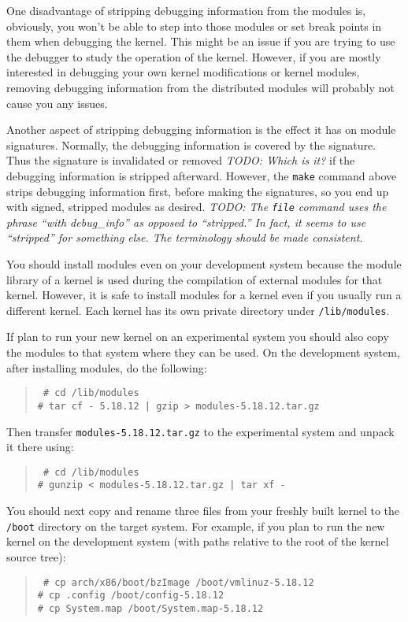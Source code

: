 \documentclass{article}
\newcommand{\command}[1]{\texttt{#1}}
\newcommand{\filename}[1]{\texttt{#1}}
\newcommand{\todo}[1]{\textit{TODO: #1}}
\newenvironment{commands}
  {\begin{quote} \tt}
  {\end{quote}}
\begin{document}
One disadvantage of stripping debugging information from the modules is, obviously, you won't be
able to step into those modules or set break points in them when debugging the kernel. This
might be an issue if you are trying to use the debugger to study the operation of the kernel.
However, if you are mostly interested in debugging your own kernel modifications or kernel
modules, removing debugging information from the distributed modules will probably not cause you
any issues.

Another aspect of stripping debugging information is the effect it has on module signatures.
Normally, the debugging information is covered by the signature. Thus the signature is
invalidated or removed \todo{Which is it?} if the debugging information is stripped afterward.
However, the \command{make} command above strips debugging information first, before making the
signatures, so you end up with signed, stripped modules as desired. \todo{The \command{file}
  command uses the phrase ``with debug_info'' as opposed to ``stripped.'' In fact, it seems to
  use ``stripped'' for something else. The terminology should be made consistent.}

You should install modules even on your development system because the module library of a
kernel is used during the compilation of external modules for that kernel. However, it is safe
to install modules for a kernel even if you usually run a different kernel. Each kernel has its
own private directory under \filename{/lib/modules}.

If plan to run your new kernel on an experimental system you should also copy the modules to
that system where they can be used. On the development system, after installing modules, do the
following:
\begin{commands}
  \# cd /lib/modules \\
  \# tar cf - 5.18.12 | gzip > modules-5.18.12.tar.gz
\end{commands}

Then transfer \filename{modules-5.18.12.tar.gz} to the experimental system and unpack it there
using:
\begin{commands}
  \# cd /lib/modules \\
  \# gunzip < modules-5.18.12.tar.gz | tar xf -
\end{commands}

You should next copy and rename three files from your freshly built kernel to the
\filename{/boot} directory on the target system. For example, if you plan to run the new kernel
on the development system (with paths relative to the root of the kernel source tree):
\begin{commands}
  \# cp arch/x86/boot/bzImage /boot/vmlinuz-5.18.12 \\
  \# cp .config /boot/config-5.18.12 \\
  \# cp System.map /boot/System.map-5.18.12
\end{commands}
\end{document}
